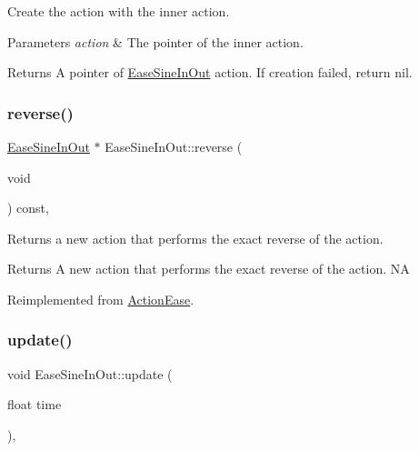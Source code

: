 Create the action with the inner action. 


\begin{DoxyParams}{Parameters}
{\em action} & The pointer of the inner action. \\
\hline
\end{DoxyParams}
\begin{DoxyReturn}{Returns}
A pointer of \hyperlink{classEaseSineInOut}{Ease\+Sine\+In\+Out} action. If creation failed, return nil. 
\end{DoxyReturn}
\mbox{\label{classEaseSineInOut_aa8aba440311e86fcab00307d5359263d}} 
\subsubsection{\texorpdfstring{reverse()}{reverse()}}
{\footnotesize\ttfamily \hyperlink{classEaseSineInOut}{Ease\+Sine\+In\+Out} $\ast$ Ease\+Sine\+In\+Out\+::reverse (\begin{DoxyParamCaption}\item[{void}]{ }\end{DoxyParamCaption}) const\hspace{0.3cm}{\ttfamily [override]}, {\ttfamily [virtual]}}

Returns a new action that performs the exact reverse of the action.

\begin{DoxyReturn}{Returns}
A new action that performs the exact reverse of the action.  NA 
\end{DoxyReturn}


Reimplemented from \hyperlink{classActionEase_ab99eb083fa033fae1d6c948fdc730782}{Action\+Ease}.

\mbox{\label{classEaseSineInOut_a6c5c73d3e2bfeb21315b2d9798cf562f}} 
\subsubsection{\texorpdfstring{update()}{update()}}
{\footnotesize\ttfamily void Ease\+Sine\+In\+Out\+::update (\begin{DoxyParamCaption}\item[{float}]{time }\end{DoxyParamCaption})\hspace{0.3cm}{\ttfamily [override]}, {\ttfamily [virtual]}}

